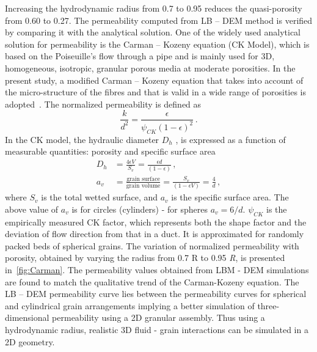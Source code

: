 Increasing the hydrodynamic radius from 0.7 to 0.95 reduces the quasi-porosity 
from 0.60 to 0.27. The permeability computed from LB – DEM method is verified 
by comparing it with the analytical solution. One of the widely used analytical 
solution for permeability is the Carman – Kozeny equation (CK Model), 
which is based on the Poiseuille's flow through a pipe and is mainly used for 
3D, homogeneous, isotropic, granular porous media at moderate porosities. In 
the present study, a modified Carman – Kozeny equation that takes into account 
of the micro-structure of the fibres and that is valid in a wide range of 
porosities is adopted~\citep{Yazdchi2011}. The normalized permeability is 
defined as
\begin{equation}
\frac{k}{d^2} = \frac{\epsilon}{\psi_{CK}(1-\epsilon)^2} \,.
\end{equation}
%
In the CK model, the hydraulic diameter $D_h$ , is expressed as a function of 
measurable quantities: porosity and specific surface area
%
\begin{align}
D_h & = \frac{4\epsilon V}{S_v}=\frac{\epsilon d}{(1 - \epsilon)} \,, \\
a_v & = \frac{\mbox{grain surface}}{\mbox{grain volume}} = 
\frac{S_v}{(1-\epsilon V)} = \frac{4}{d} \,,
\end{align}
%
where $S_v$ is the total wetted surface, and $a_v$ is the specific surface 
area. The above value of $a_v$ is for circles (cylinders) - for spheres $a_v = 
6/d$. $\psi_{CK}$ is the empirically  measured CK factor, which represents both 
the shape factor and the deviation of flow direction from that in a duct. It is 
approximated for randomly packed beds of spherical grains. The variation of 
normalized permeability with porosity, obtained by varying the radius from 0.7 R
to 0.95 \textit{R}, is presented in~\cref{fig:Carman}. The permeability values 
obtained 
from LBM - DEM simulations are found to match the qualitative trend of the 
Carman-Kozeny equation. The LB – DEM permeability curve lies between the 
permeability curves for spherical and cylindrical grain arrangements implying a 
better simulation of three-dimensional permeability using a 2D granular 
assembly. Thus using a hydrodynamic radius, realistic 3D fluid - grain 
interactions can be simulated in a 2D geometry.

